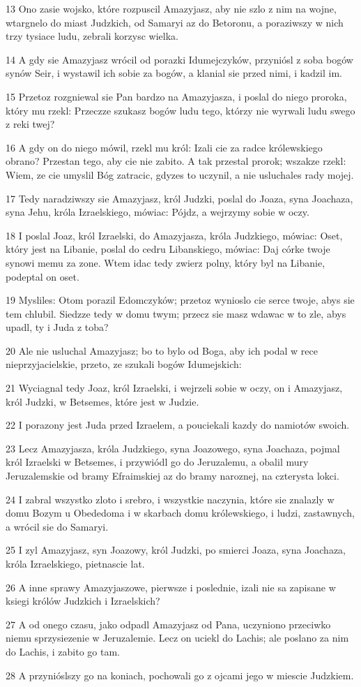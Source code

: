 \par 13 Ono zasie wojsko, które rozpuscil Amazyjasz, aby nie szlo z nim na wojne, wtargnelo do miast Judzkich, od Samaryi az do Betoronu, a poraziwszy w nich trzy tysiace ludu, zebrali korzysc wielka.
\par 14 A gdy sie Amazyjasz wrócil od porazki Idumejczyków, przyniósl z soba bogów synów Seir, i wystawil ich sobie za bogów, a klanial sie przed nimi, i kadzil im.
\par 15 Przetoz rozgniewal sie Pan bardzo na Amazyjasza, i poslal do niego proroka, który mu rzekl: Przeczze szukasz bogów ludu tego, którzy nie wyrwali ludu swego z reki twej?
\par 16 A gdy on do niego mówil, rzekl mu król: Izali cie za radce królewskiego obrano? Przestan tego, aby cie nie zabito. A tak przestal prorok; wszakze rzekl: Wiem, ze cie umyslil Bóg zatracic, gdyzes to uczynil, a nie usluchales rady mojej.
\par 17 Tedy naradziwszy sie Amazyjasz, król Judzki, poslal do Joaza, syna Joachaza, syna Jehu, króla Izraelskiego, mówiac: Pójdz, a wejrzymy sobie w oczy.
\par 18 I poslal Joaz, król Izraelski, do Amazyjasza, króla Judzkiego, mówiac: Oset, który jest na Libanie, poslal do cedru Libanskiego, mówiac: Daj córke twoje synowi memu za zone. Wtem idac tedy zwierz polny, który byl na Libanie, podeptal on oset.
\par 19 Mysliles: Otom porazil Edomczyków; przetoz wynioslo cie serce twoje, abys sie tem chlubil. Siedzze tedy w domu twym; przecz sie masz wdawac w to zle, abys upadl, ty i Juda z toba?
\par 20 Ale nie usluchal Amazyjasz; bo to bylo od Boga, aby ich podal w rece nieprzyjacielskie, przeto, ze szukali bogów Idumejskich:
\par 21 Wyciagnal tedy Joaz, król Izraelski, i wejrzeli sobie w oczy, on i Amazyjasz, król Judzki, w Betsemes, które jest w Judzie.
\par 22 I porazony jest Juda przed Izraelem, a pouciekali kazdy do namiotów swoich.
\par 23 Lecz Amazyjasza, króla Judzkiego, syna Joazowego, syna Joachaza, pojmal król Izraelski w Betsemes, i przywiódl go do Jeruzalemu, a obalil mury Jeruzalemskie od bramy Efraimskiej az do bramy naroznej, na czterysta lokci.
\par 24 I zabral wszystko zloto i srebro, i wszystkie naczynia, które sie znalazly w domu Bozym u Obededoma i w skarbach domu królewskiego, i ludzi, zastawnych, a wrócil sie do Samaryi.
\par 25 I zyl Amazyjasz, syn Joazowy, król Judzki, po smierci Joaza, syna Joachaza, króla Izraelskiego, pietnascie lat.
\par 26 A inne sprawy Amazyjaszowe, pierwsze i poslednie, izali nie sa zapisane w ksiegi królów Judzkich i Izraelskich?
\par 27 A od onego czasu, jako odpadl Amazyjasz od Pana, uczyniono przeciwko niemu sprzysiezenie w Jeruzalemie. Lecz on uciekl do Lachis; ale poslano za nim do Lachis, i zabito go tam.
\par 28 A przynióslszy go na koniach, pochowali go z ojcami jego w miescie Judzkiem.

